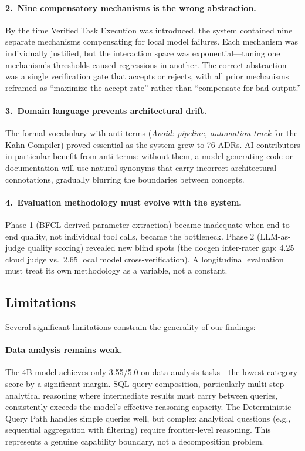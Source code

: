 \documentclass{article}
\begin{document}
\paragraph{2.\ Nine compensatory mechanisms is the wrong abstraction.}
By the time Verified Task Execution was introduced, the system contained nine separate mechanisms compensating for local model failures.
Each mechanism was individually justified, but the interaction space was exponential---tuning one mechanism's thresholds caused regressions in another.
The correct abstraction was a single verification gate that accepts or rejects, with all prior mechanisms reframed as ``maximize the accept rate'' rather than ``compensate for bad output.''

\paragraph{3.\ Domain language prevents architectural drift.}
The formal vocabulary with anti-terms (\emph{Avoid: pipeline, automation track} for the Kahn Compiler) proved essential as the system grew to 76 ADRs.
AI contributors in particular benefit from anti-terms: without them, a model generating code or documentation will use natural synonyms that carry incorrect architectural connotations, gradually blurring the boundaries between concepts.

\paragraph{4.\ Evaluation methodology must evolve with the system.}
Phase 1 (BFCL-derived parameter extraction) became inadequate when end-to-end quality, not individual tool calls, became the bottleneck.
Phase 2 (LLM-as-judge quality scoring) revealed new blind spots (the docgen inter-rater gap: 4.25 cloud judge vs.\ 2.65 local model cross-verification).
A longitudinal evaluation must treat its own methodology as a variable, not a constant.

\subsection{Limitations}
\label{sec:limitations}

Several significant limitations constrain the generality of our findings:

\paragraph{Data analysis remains weak.}
The 4B model achieves only 3.55/5.0 on data analysis tasks---the lowest category score by a significant margin.
SQL query composition, particularly multi-step analytical reasoning where intermediate results must carry between queries, consistently exceeds the model's effective reasoning capacity.
The Deterministic Query Path handles simple queries well, but complex analytical questions (e.g., sequential aggregation with filtering) require frontier-level reasoning.
This represents a genuine capability boundary, not a decomposition problem.
\end{document}
